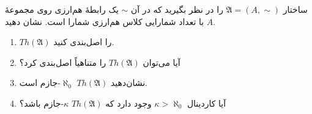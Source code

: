 ساختار $\mathfrak{A} = (A, \sim)$ را در نظر بگیرید که در آن $\sim$ یک رابطهٔ هم‌ارزی روی مجموعهٔ $A$ با تعداد شمارایی کلاس هم‌ارزی شمارا است. نشان دهید.
\begin{enumerate}[label=(\alph*)]
  \item $Th(\mathfrak{A})$ را اصل‌بندی کنید.
  \item آیا می‌توان $Th(\mathfrak{A})$ را متناهیاً اصل‌بندی کرد؟
  \item نشان‌دهید $Th(\mathfrak{A})$ $\aleph_0$-جازم است.
  \item آیا کاردینال $\kappa > \aleph_0$ وجود دارد که $Th(\mathfrak{A})$ $\kappa$-جازم باشد؟
\end{enumerate}\quad
\begin{ans}
\end{ans}
